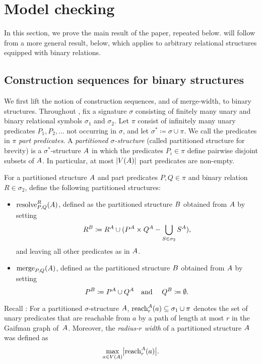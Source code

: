 \section{Model checking}\label{sec:mc}
In this section, we prove the main result of the paper, repeated below.
\intromain*
{} will follow from a more general result,  below,
which applies to arbitrary relational structures equipped with binary relations.


\subsection{Construction sequences for binary structures}\label{sec:computing}
\newcommand{\merge}[2]{\mathrm{merge}_{#1,#2}}
\newcommand{\resolve}[3]{\mathrm{resolve}^{#1}_{#2,#3}}
We first lift the notion of construction sequences, and of merge-width, to binary structures.
Throughout , fix a signature $\sigma$
consisting of finitely many unary and binary relational symbols \(\sigma_1\) and \(\sigma_2\).
Let $\pi$ consist of infinitely many unary predicates $P_1,P_2,\ldots$ not occurring in $\sigma$,
and let $\sigma^*\coloneqq\sigma\cup\pi$.
We call the predicates in $\pi$ \emph{part predicates}.
A \emph{partitioned $\sigma$-structure} (called partitioned structure for brevity)
is a $\sigma^*$-structure ${{A}}$ in which
the predicates $P_i\in\pi$ define pairwise disjoint subsets of ${{A}}$. 
In particular, at most $|V({{A}})|$ part predicates are non-empty.



For a partitioned structure ${{A}}$ and 
 part predicates $P,Q\in \pi$ and binary relation $R\in\sigma_2$,
define the following partitioned structures:
\begin{itemize}
\item $\resolve RPQ(\str A)$, defined as the partitioned structure ${{B}}$ obtained from ${{A}}$ by setting $$R^{{B}}\coloneqq R^{{A}}\cup (P^{{A}}\times Q^{{A}}-\bigcup_{S\in\sigma_2} S^{{A}}),$$ and leaving all other predicates as in ${{A}}$.

\item $\merge PQ(\str A)$, defined as the partitioned structure ${{B}}$ obtained from ${{A}}$ 
 by setting $$P^{{{B}}}\coloneqq P^{{{A}}}\cup Q^{{{A}}}\text{\quad and \quad} Q^{{{B}}}\coloneqq\emptyset.$$
\end{itemize}

Recall : For a partitioned $\sigma$-structure ${{A}}$, ${\rm reach}_r^{{{A}}}(a)\subseteq \sigma_1\cup\pi$ denotes the set of unary predicates that are reachable from $a$ by a path of length at most $r$ in the Gaifman graph of~${{A}}$.
Moreover, the \emph{radius-$r$ width} of a partitioned structure ${{A}}$
was defined as $$\max_{a\in V({{A}})}\bigl|{\rm reach}_r^{{{A}}}(a)\bigr|.$$

